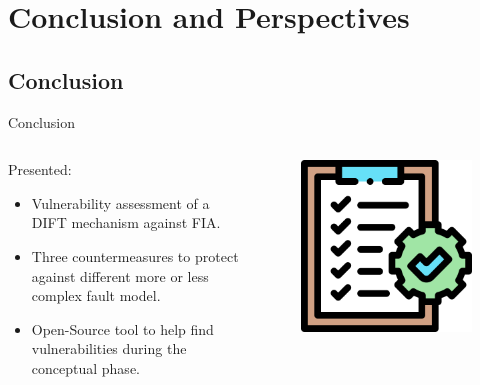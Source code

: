 \section{Conclusion and Perspectives}


\subsection{Conclusion}
\begin{frame}{Conclusion}
    \begin{columns}
        \begin{column}{.7\linewidth}
            \begin{block}{Presented:}
                \begin{itemize}
                    [triangle]
                    \item Vulnerability assessment of a DIFT mechanism against FIA.
                    \item Three countermeasures to protect against different more or less complex fault model.
                    \item Open-Source tool to help find vulnerabilities during the conceptual phase.
                \end{itemize}
            \end{block}
        \end{column}
        \begin{column}{.3\linewidth}
            \begin{figure}
                \centering
                \includegraphics[height=.25\textheight]{src/6_conclusion/img/conclusion.png}
            \end{figure}
        \end{column}
    \end{columns}
\end{frame}

